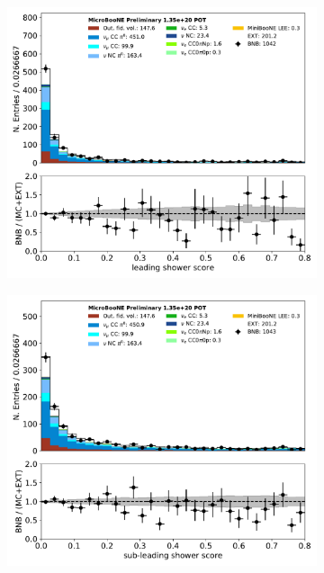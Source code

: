 \documentclass[a4paper]{article}
\begin{document}
\begin{figure}[H]
\begin{center}
    \begin{subfigure}[b]{0.38\textwidth}
    \centering
    \includegraphics[width=1.00\textwidth]{pi0/pi0_shrscore1_01152020_inputs_RUN1.pdf}
    \end{subfigure}
    \begin{subfigure}[b]{0.38\textwidth}
    \centering
    \includegraphics[width=1.00\textwidth]{pi0/pi0_shrscore2_01152020_inputs_RUN1.pdf}
    \end{subfigure}
    

\end{center}
\end{figure}
\end{document}
